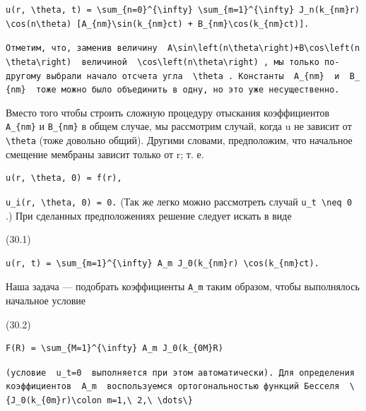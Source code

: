 \documentclass[
  ukrainian,
]{article}
\begin{document}
\begin{verbatim}
u(r, \theta, t) = \sum_{n=0}^{\infty} \sum_{m=1}^{\infty} J_n(k_{nm}r) \cos(n\theta) [A_{nm}\sin(k_{nm}ct) + B_{nm}\cos(k_{nm}ct)].
\end{verbatim}

\texttt{Отметим,\ что,\ заменив\ величину\ \ \textquotesingle{}A\textbackslash{}sin\textbackslash{}left(n\textbackslash{}theta\textbackslash{}right)+B\textbackslash{}cos\textbackslash{}left(n\textbackslash{}theta\textbackslash{}right)\textquotesingle{}\ \ величиной\ \ \textquotesingle{}\textbackslash{}cos\textbackslash{}left(n\textbackslash{}theta\textbackslash{}right)\textquotesingle{}\ ,\ мы\ только\ по-другому\ выбрали\ начало\ отсчета\ угла\ \ \textquotesingle{}\textbackslash{}theta\textquotesingle{}\ .\ Константы\ \ \textquotesingle{}A\_\{nm\}\textquotesingle{}\ \ и\ \ \textquotesingle{}B\_\{nm\}\textquotesingle{}\ \ тоже\ можно\ было\ объединить\ в\ одну,\ но\ это\ уже\ несущественно.}

Вместо того чтобы строить сложную процедуру отыскания коэффициентов
\texttt{A\_\{nm\}} и \texttt{B\_\{nm\}} в общем случае, мы рассмотрим
случай, когда u не зависит от \texttt{\textbackslash{}theta} (тоже
довольно общий). Другими словами, предположим, что начальное смещение
мембраны зависит только от r; т. е.

\begin{verbatim}
u(r, \theta, 0) = f(r),
\end{verbatim}

\texttt{u\_i(r,\ \textbackslash{}theta,\ 0)\ =\ 0.} (Так же легко можно
рассмотреть случай \texttt{u\_t\ \textbackslash{}neq\ 0} .) При
сделанных предположениях решение следует искать в виде

(30.1)

\begin{verbatim}
u(r, t) = \sum_{m=1}^{\infty} A_m J_0(k_{nm}r) \cos(k_{nm}ct).
\end{verbatim}

Наша задача --- подобрать коэффициенты \texttt{A\_m} таким образом,
чтобы выполнялось начальное условие

(30.2)

\begin{verbatim}
F(R) = \sum_{M=1}^{\infty} A_m J_0(k_{0M}R)
\end{verbatim}

\texttt{(условие\ \ \textquotesingle{}u\_t=0\textquotesingle{}\ \ выполняется\ при\ этом\ автоматически).\ Для\ определения\ коэффициентов\ \ \textquotesingle{}A\_m\textquotesingle{}\ \ воспользуемся\ ортогональностью\ функций\ Бесселя\ \ \textquotesingle{}\textbackslash{}\{J\_0(k\_\{0m\}r)\textbackslash{}colon\ m=1,\textbackslash{}\ 2,\textbackslash{}\ \textbackslash{}dots\textbackslash{}\}\textquotesingle{}}
\end{document}

